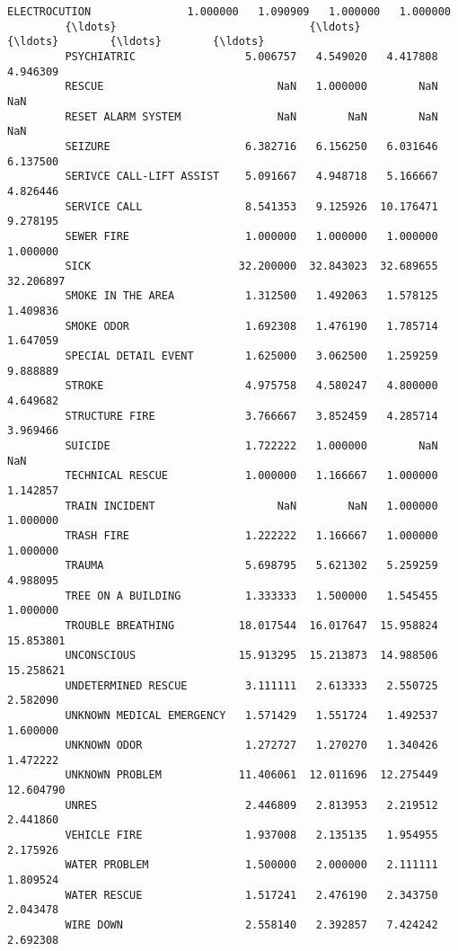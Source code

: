\documentclass[11pt]{article}
\begin{document}
\begin{Verbatim}[commandchars=\\\{\}]
         ELECTROCUTION               1.000000   1.090909   1.000000   1.000000   
         {\ldots}                              {\ldots}        {\ldots}        {\ldots}        {\ldots}   
         PSYCHIATRIC                 5.006757   4.549020   4.417808   4.946309   
         RESCUE                           NaN   1.000000        NaN        NaN   
         RESET ALARM SYSTEM               NaN        NaN        NaN        NaN   
         SEIZURE                     6.382716   6.156250   6.031646   6.137500   
         SERIVCE CALL-LIFT ASSIST    5.091667   4.948718   5.166667   4.826446   
         SERVICE CALL                8.541353   9.125926  10.176471   9.278195   
         SEWER FIRE                  1.000000   1.000000   1.000000   1.000000   
         SICK                       32.200000  32.843023  32.689655  32.206897   
         SMOKE IN THE AREA           1.312500   1.492063   1.578125   1.409836   
         SMOKE ODOR                  1.692308   1.476190   1.785714   1.647059   
         SPECIAL DETAIL EVENT        1.625000   3.062500   1.259259   9.888889   
         STROKE                      4.975758   4.580247   4.800000   4.649682   
         STRUCTURE FIRE              3.766667   3.852459   4.285714   3.969466   
         SUICIDE                     1.722222   1.000000        NaN        NaN   
         TECHNICAL RESCUE            1.000000   1.166667   1.000000   1.142857   
         TRAIN INCIDENT                   NaN        NaN   1.000000   1.000000   
         TRASH FIRE                  1.222222   1.166667   1.000000   1.000000   
         TRAUMA                      5.698795   5.621302   5.259259   4.988095   
         TREE ON A BUILDING          1.333333   1.500000   1.545455   1.000000   
         TROUBLE BREATHING          18.017544  16.017647  15.958824  15.853801   
         UNCONSCIOUS                15.913295  15.213873  14.988506  15.258621   
         UNDETERMINED RESCUE         3.111111   2.613333   2.550725   2.582090   
         UNKNOWN MEDICAL EMERGENCY   1.571429   1.551724   1.492537   1.600000   
         UNKNOWN ODOR                1.272727   1.270270   1.340426   1.472222   
         UNKNOWN PROBLEM            11.406061  12.011696  12.275449  12.604790   
         UNRES                       2.446809   2.813953   2.219512   2.441860   
         VEHICLE FIRE                1.937008   2.135135   1.954955   2.175926   
         WATER PROBLEM               1.500000   2.000000   2.111111   1.809524   
         WATER RESCUE                1.517241   2.476190   2.343750   2.043478   
         WIRE DOWN                   2.558140   2.392857   7.424242   2.692308   
         

\end{Verbatim}
\end{document}

